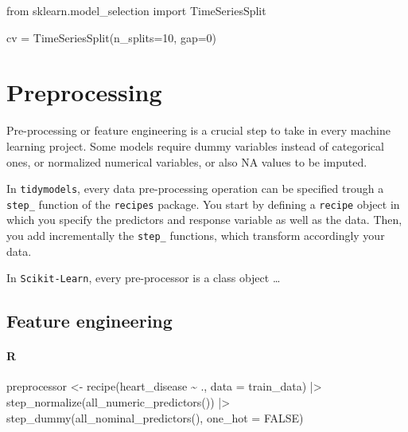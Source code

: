 \documentclass[
  letterpaper,
  DIV=11,
  numbers=noendperiod]{scrreprt}
\newenvironment{Shaded}{\begin{snugshade}}{\end{snugshade}}
\newcommand{\AttributeTok}[1]{\textcolor[rgb]{0.40,0.46,0.14}{#1}}
\newcommand{\ConstantTok}[1]{\textcolor[rgb]{0.56,0.35,0.01}{#1}}
\newcommand{\DecValTok}[1]{\textcolor[rgb]{0.68,0.00,0.00}{#1}}
\newcommand{\FunctionTok}[1]{\textcolor[rgb]{0.28,0.35,0.67}{#1}}
\newcommand{\ImportTok}[1]{\textcolor[rgb]{0.00,0.46,0.62}{#1}}
\newcommand{\NormalTok}[1]{\textcolor[rgb]{0.00,0.46,0.62}{#1}}
\newcommand{\OperatorTok}[1]{\textcolor[rgb]{0.37,0.37,0.37}{#1}}
\newcommand{\OtherTok}[1]{\textcolor[rgb]{0.00,0.46,0.62}{#1}}
\newcommand{\SpecialCharTok}[1]{\textcolor[rgb]{0.37,0.37,0.37}{#1}}
\begin{document}
\begin{Shaded}
\begin{Highlighting}[]
\ImportTok{from}\NormalTok{ sklearn.model\_selection }\ImportTok{import}\NormalTok{ TimeSeriesSplit}

\NormalTok{cv }\OperatorTok{=}\NormalTok{ TimeSeriesSplit(n\_splits}\OperatorTok{=}\DecValTok{10}\NormalTok{, gap}\OperatorTok{=}\DecValTok{0}\NormalTok{)}
\end{Highlighting}
\end{Shaded}

\hypertarget{preprocessing}{%
\chapter{Preprocessing}\label{preprocessing}}

Pre-processing or feature engineering is a crucial step to take in every
machine learning project. Some models require dummy variables instead of
categorical ones, or normalized numerical variables, or also NA values
to be imputed.

In \texttt{tidymodels}, every data pre-processing operation can be
specified trough a \texttt{step\_} function of the \texttt{recipes}
package. You start by defining a \texttt{recipe} object in which you
specify the predictors and response variable as well as the data. Then,
you add incrementally the \texttt{step\_} functions, which transform
accordingly your data.

In \texttt{Scikit-Learn}, every pre-processor is a class object \ldots{}

\hypertarget{feature-engineering}{%
\section{Feature engineering}\label{feature-engineering}}

\hypertarget{r-61}{%
\subsubsection{R}\label{r-61}}

\begin{Shaded}
\begin{Highlighting}[]
\NormalTok{preprocessor }\OtherTok{\textless{}{-}} \FunctionTok{recipe}\NormalTok{(heart\_disease }\SpecialCharTok{\textasciitilde{}}\NormalTok{ ., }\AttributeTok{data =}\NormalTok{ train\_data) }\SpecialCharTok{|\textgreater{}} 
    \FunctionTok{step\_normalize}\NormalTok{(}\FunctionTok{all\_numeric\_predictors}\NormalTok{()) }\SpecialCharTok{|\textgreater{}} 
    \FunctionTok{step\_dummy}\NormalTok{(}\FunctionTok{all\_nominal\_predictors}\NormalTok{(), }\AttributeTok{one\_hot =} \ConstantTok{FALSE}\NormalTok{)}
\end{Highlighting}
\end{Shaded}
\end{document}
